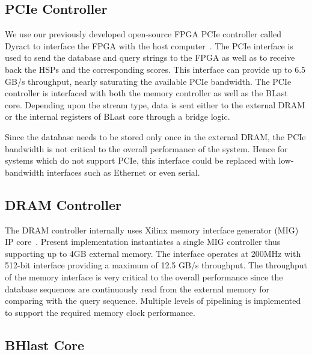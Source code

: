 \subsection{PCIe Controller}
We use our previously developed open-source FPGA PCIe controller called Dyract to interface the FPGA with the host computer~\cite{Vipin2014}.
The PCIe interface is used to send the database and query strings to the FPGA as well as to receive back the HSPs and the corresponding scores.
This interface can provide up to 6.5 GB/s throughput, nearly saturating the available PCIe bandwidth.
The PCIe controller is interfaced with both the memory controller as well as the BLast core.
Depending upon the stream type, data is sent either to the external DRAM or the internal registers of BLast core through a bridge logic.

Since the database needs to be stored only once in the external DRAM, the PCIe bandwidth is not critical to the overall performance of the system. Hence for systems which do not support PCIe, this interface could be replaced with low-bandwidth interfaces such as Ethernet or even serial.

\subsection{DRAM Controller}
The DRAM controller internally uses Xilinx memory interface generator (MIG) IP core~\cite{mig2018}. 
Present implementation instantiates a single MIG controller thus supporting up to 4GB external memory.
The interface operates at 200MHz with 512-bit interface providing a maximum of 12.5 GB/s throughput.
The throughput of the memory interface is very critical to the overall performance since the database sequences are continuously read from the external memory for comparing with the query sequence.
Multiple levels of pipelining is implemented to support the required memory clock performance.

\subsection{BHlast Core}

